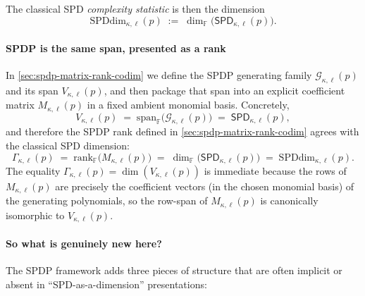 \documentclass[12pt]{article}
\theoremstyle{definition}
\theoremstyle{remark}
\begin{document}
The classical SPD \emph{complexity statistic} is then the dimension
\[
\mathrm{SPDdim}_{\kappa,\ell}(p) \;:=\; \dim_{\mathbb{F}}\bigl(\mathsf{SPD}_{\kappa,\ell}(p)\bigr).
\]

\paragraph{SPDP is the same span, presented as a rank}
In \ref{sec:spdp-matrix-rank-codim} we define the SPDP generating family
$\mathcal{G}_{\kappa,\ell}(p)$ and its span $V_{\kappa,\ell}(p)$, and then package that span
into an explicit coefficient matrix $M_{\kappa,\ell}(p)$ in a fixed ambient monomial basis.
Concretely,
\begin{equation}
\label{eq:spdp-equals-spd-span}
V_{\kappa,\ell}(p)
\;=\;
\mathrm{span}_{\mathbb{F}}\bigl(\mathcal{G}_{\kappa,\ell}(p)\bigr)
\;=\;
\mathsf{SPD}_{\kappa,\ell}(p),
\end{equation}
and therefore the SPDP rank defined in \ref{sec:spdp-matrix-rank-codim} agrees
with the classical SPD dimension:
\begin{equation}
\label{eq:spdp-rank-equals-spddim}
\Gamma_{\kappa,\ell}(p)
\;=\;
\mathrm{rank}_{\mathbb{F}}\!\bigl(M_{\kappa,\ell}(p)\bigr)
\;=\;
\dim_{\mathbb{F}}\bigl(\mathsf{SPD}_{\kappa,\ell}(p)\bigr)
\;=\;
\mathrm{SPDdim}_{\kappa,\ell}(p).
\end{equation}
The equality $\Gamma_{\kappa,\ell}(p)=\dim(V_{\kappa,\ell}(p))$ is immediate because the rows of
$M_{\kappa,\ell}(p)$ are precisely the coefficient vectors (in the chosen monomial basis) of
the generating polynomials, so the row-span of $M_{\kappa,\ell}(p)$ is canonically
isomorphic to $V_{\kappa,\ell}(p)$.

\paragraph{So what is genuinely new here?}
The SPDP framework adds three pieces of structure that are often implicit or absent
in ``SPD-as-a-dimension'' presentations:
\end{document}
